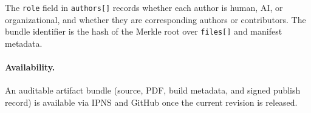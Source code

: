 \documentclass[11pt]{article}
\begin{document}
The \texttt{role} field in \texttt{authors[]} records whether each
author is human, AI, or organizational, and whether they are
corresponding authors or contributors.
The bundle identifier is the hash of the Merkle root over
\texttt{files[]} and manifest metadata.

\paragraph{Availability.}
An auditable artifact bundle (source, PDF, build metadata, and signed
publish record) is available via IPNS and GitHub once the current
revision is released.

\end{document}

